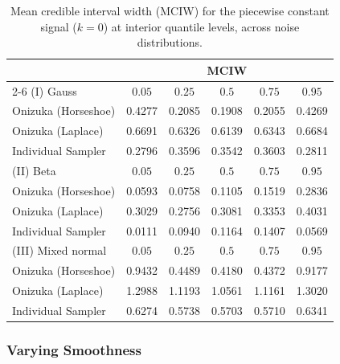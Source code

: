 \begin{table}[htbp]
\centering
\caption{Mean credible interval width (MCIW) for the piecewise constant signal ($k=0$) at interior quantile levels, across noise distributions.}
\label{tab:pc_int_mciw}
\begin{tabular}{lccccc}
\toprule
& \multicolumn{5}{c}{MCIW} \\
\cmidrule(lr){2-6}
(I) Gauss & $0.05$ & $0.25$ & $0.5$ & $0.75$ & $0.95$ \\
\midrule
Onizuka (Horseshoe) & 0.4277 & 0.2085 & 0.1908 & 0.2055 & 0.4269 \\
Onizuka (Laplace)   & 0.6691 & 0.6326 & 0.6139 & 0.6343 & 0.6684 \\
Individual Sampler  & 0.2796 & 0.3596 & 0.3542 & 0.3603 & 0.2811 \\
\midrule
(II) Beta & $0.05$ & $0.25$ & $0.5$ & $0.75$ & $0.95$ \\
\midrule
Onizuka (Horseshoe) & 0.0593 & 0.0758 & 0.1105 & 0.1519 & 0.2836 \\
Onizuka (Laplace)   & 0.3029 & 0.2756 & 0.3081 & 0.3353 & 0.4031 \\
Individual Sampler  & 0.0111 & 0.0940 & 0.1164 & 0.1407 & 0.0569 \\
\midrule
(III) Mixed normal & $0.05$ & $0.25$ & $0.5$ & $0.75$ & $0.95$ \\
\midrule
Onizuka (Horseshoe) & 0.9432 & 0.4489 & 0.4180 & 0.4372 & 0.9177 \\
Onizuka (Laplace)   & 1.2988 & 1.1193 & 1.0561 & 1.1161 & 1.3020 \\
Individual Sampler  & 0.6274 & 0.5738 & 0.5703 & 0.5710 & 0.6341 \\
\bottomrule
\end{tabular}
\end{table}

\subsubsection{Varying Smoothness}
\label{sec:sim:ind:vs}

